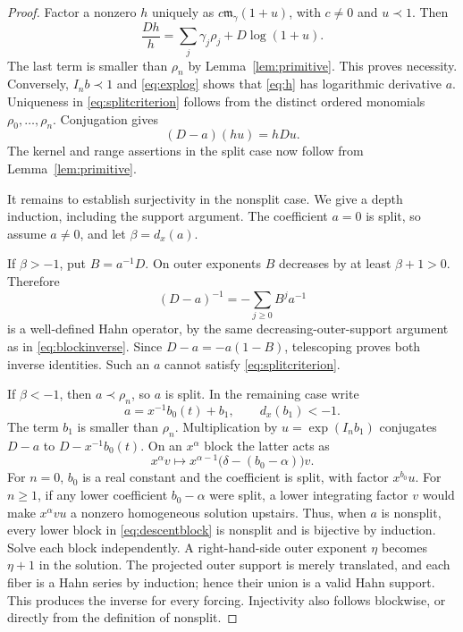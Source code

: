 \documentclass[11pt,a4paper]{article}
\numberwithin{equation}{section}
\theoremstyle{definition}
\theoremstyle{remark}\newtheorem{remark}[theorem]{Remark}
\begin{document}
\begin{proof}
Factor a nonzero $h$ uniquely as $c\mathfrak m_\gamma(1+u)$, with $c\ne0$ and $u\prec1$. Then
\[
 \frac{Dh}{h}=\sum_j\gamma_j\rho_j+D\log(1+u).
\]
The last term is smaller than $\rho_n$ by Lemma~\ref{lem:primitive}. This proves necessity. Conversely, $I_nb\prec1$ and \eqref{eq:explog} shows that \eqref{eq:h} has logarithmic derivative $a$. Uniqueness in \eqref{eq:splitcriterion} follows from the distinct ordered monomials $\rho_0,\ldots,\rho_n$. Conjugation gives
\begin{equation}
 (D-a)(hu)=hDu.
 \label{eq:conjugation}
\end{equation}
The kernel and range assertions in the split case now follow from Lemma~\ref{lem:primitive}.

It remains to establish surjectivity in the nonsplit case. We give a depth induction, including the support argument. The coefficient $a=0$ is split, so assume $a\ne0$, and let $\beta=d_x(a)$.

If $\beta>-1$, put $B=a^{-1}D$. On outer exponents $B$ decreases by at least $\beta+1>0$. Therefore
\begin{equation}
 (D-a)^{-1}=-\sum_{j\ge0}B^j a^{-1}
 \label{eq:dominantinverse}
\end{equation}
is a well-defined Hahn operator, by the same decreasing-outer-support argument as in \eqref{eq:blockinverse}. Since $D-a=-a(1-B)$, telescoping proves both inverse identities. Such an $a$ cannot satisfy \eqref{eq:splitcriterion}.

If $\beta<-1$, then $a\prec\rho_n$, so $a$ is split. In the remaining case write
\[
 a=x^{-1}b_0(t)+b_1,\qquad d_x(b_1)<-1.
\]
The term $b_1$ is smaller than $\rho_n$. Multiplication by $u=\exp(I_n b_1)$ conjugates $D-a$ to $D-x^{-1}b_0(t)$. On an $x^\alpha$ block the latter acts as
\begin{equation}
 x^\alpha v\longmapsto x^{\alpha-1}
 \bigl(\delta-(b_0-\alpha)\bigr)v.
 \label{eq:descentblock}
\end{equation}
For $n=0$, $b_0$ is a real constant and the coefficient is split, with factor $x^{b_0}u$. For $n\ge1$, if any lower coefficient $b_0-\alpha$ were split, a lower integrating factor $v$ would make $x^\alpha v u$ a nonzero homogeneous solution upstairs. Thus, when $a$ is nonsplit, every lower block in \eqref{eq:descentblock} is nonsplit and is bijective by induction. Solve each block independently. A right-hand-side outer exponent $\eta$ becomes $\eta+1$ in the solution. The projected outer support is merely translated, and each fiber is a Hahn series by induction; hence their union is a valid Hahn support. This produces the inverse for every forcing. Injectivity also follows blockwise, or directly from the definition of nonsplit.
\end{proof}
\end{document}
